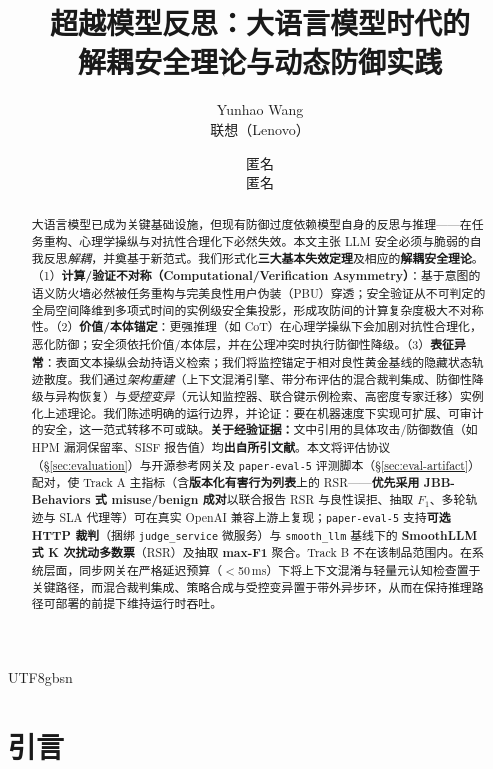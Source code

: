 \documentclass[letterpaper,twocolumn,10pt]{article}
\title{\Large \bf 超越模型反思：大语言模型时代的\\
  解耦安全理论与动态防御实践}
\author{
Yunhao Wang\\
联想（Lenovo） \and
匿名\\
匿名
}
\date{}
\begin{document}
\begin{CJK}{UTF8}{gbsn}
\maketitle

\begin{abstract}
大语言模型已成为关键基础设施，但现有防御过度依赖模型自身的反思与推理——在任务重构、心理学操纵与对抗性合理化下必然失效。本文主张 LLM 安全必须与脆弱的自我反思\emph{解耦}，并奠基于新范式。我们形式化\textbf{三大基本失效定理}及相应的\textbf{解耦安全理论}。（1）\textbf{计算/验证不对称（Computational/Verification Asymmetry）}：基于意图的语义防火墙必然被任务重构与完美良性用户伪装（PBU）穿透；安全验证从不可判定的全局空间降维到多项式时间的实例级安全集投影，形成攻防间的计算复杂度极大不对称性。（2）\textbf{价值/本体锚定}：更强推理（如 CoT）在心理学操纵下会加剧对抗性合理化，恶化防御；安全须依托价值/本体层，并在公理冲突时执行防御性降级。（3）\textbf{表征异常}：表面文本操纵会劫持语义检索；我们将监控锚定于相对良性黄金基线的隐藏状态轨迹散度。我们通过\emph{架构重建}（上下文混淆引擎、带分布评估的混合裁判集成、防御性降级与异构恢复）与\emph{受控变异}（元认知监控器、联合键示例检索、高密度专家迁移）实例化上述理论。我们陈述明确的运行边界，并论证：要在机器速度下实现可扩展、可审计的安全，这一范式转移不可或缺。\textbf{关于经验证据：}文中引用的具体攻击/防御数值（如 HPM 漏洞保留率、SISF 报告值）均\textbf{出自所引文献}。本文将评估协议（\S\ref{sec:evaluation}）与开源参考网关及 \texttt{paper-eval-5} 评测脚本（\S\ref{sec:eval-artifact}）配对，使 Track A 主指标（含\textbf{版本化有害行为列表}上的 RSR——\textbf{优先采用 JBB-Behaviors 式 misuse/benign 成对}以联合报告 RSR 与良性误拒、抽取 $F_1$、多轮轨迹与 SLA 代理等）可在真实 OpenAI 兼容上游上复现；\texttt{paper-eval-5} 支持\textbf{可选 HTTP 裁判}（捆绑 \texttt{judge\_service} 微服务）与 \texttt{smooth\_llm} 基线下的 \textbf{SmoothLLM 式 K 次扰动多数票}（RSR）及抽取 \textbf{max-F1} 聚合。Track B 不在该制品范围内。在系统层面，同步网关在严格延迟预算（$<$50\,ms）下将上下文混淆与轻量元认知检查置于关键路径，而混合裁判集成、策略合成与受控变异置于带外异步环，从而在保持推理路径可部署的前提下维持运行时吞吐。
\end{abstract}

\section{引言}


\end{CJK}
\end{document}
